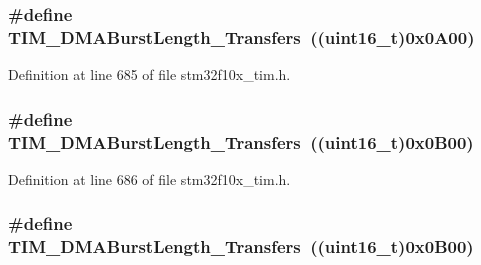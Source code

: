 \subsubsection[{\texorpdfstring{T\+I\+M\+\_\+\+D\+M\+A\+Burst\+Length\+\_\+11\+Transfers}{TIM_DMABurstLength_11Transfers}}]{\setlength{\rightskip}{0pt plus 5cm}\#define T\+I\+M\+\_\+\+D\+M\+A\+Burst\+Length\+\_\+Transfers~(({\bf uint16\+\_\+t})0x0\+A00)}\hypertarget{group___t_i_m___d_m_a___burst___length_ga0ca63a3caeaf1e85bd54961891949de7}{}\label{group___t_i_m___d_m_a___burst___length_ga0ca63a3caeaf1e85bd54961891949de7}


Definition at line 685 of file stm32f10x\+\_\+tim.\+h.

\subsubsection[{\texorpdfstring{T\+I\+M\+\_\+\+D\+M\+A\+Burst\+Length\+\_\+12\+Transfers}{TIM_DMABurstLength_12Transfers}}]{\setlength{\rightskip}{0pt plus 5cm}\#define T\+I\+M\+\_\+\+D\+M\+A\+Burst\+Length\+\_\+Transfers~(({\bf uint16\+\_\+t})0x0\+B00)}\hypertarget{group___t_i_m___d_m_a___burst___length_ga9160d52913bbd7ad1e663ff943d01852}{}\label{group___t_i_m___d_m_a___burst___length_ga9160d52913bbd7ad1e663ff943d01852}


Definition at line 686 of file stm32f10x\+\_\+tim.\+h.

\subsubsection[{\texorpdfstring{T\+I\+M\+\_\+\+D\+M\+A\+Burst\+Length\+\_\+12\+Transfers}{TIM_DMABurstLength_12Transfers}}]{\setlength{\rightskip}{0pt plus 5cm}\#define T\+I\+M\+\_\+\+D\+M\+A\+Burst\+Length\+\_\+Transfers~(({\bf uint16\+\_\+t})0x0\+B00)}\hypertarget{group___t_i_m___d_m_a___burst___length_ga9160d52913bbd7ad1e663ff943d01852}{}\label{group___t_i_m___d_m_a___burst___length_ga9160d52913bbd7ad1e663ff943d01852}


